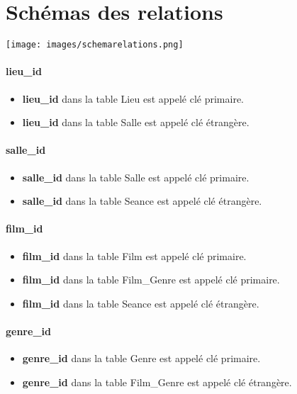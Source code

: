 \documentclass[12pt]{article}
\begin{document}
\section{Schémas des relations}
\texttt{[image: images/schemarelations.png]}
\paragraph*{{\color{cyan}lieu{\_}id}}
\begin{itemize}
    \item \textbf{{\color{cyan}lieu{\_}id}} dans la table Lieu est appelé clé primaire.
    \item \textbf{{\color{cyan}lieu{\_}id}} dans la table Salle est appelé clé étrangère.
\end{itemize}
\paragraph*{{\color{magenta}salle{\_}id}}
\begin{itemize}
    \item \textbf{{\color{magenta}salle{\_}id}} dans la table Salle est appelé clé primaire.
    \item \textbf{{\color{magenta}salle{\_}id}} dans la table Seance est appelé clé étrangère.
\end{itemize}
\pagebreak
\paragraph*{{\color{orange}film{\_}id}}
\begin{itemize}
    \item \textbf{{\color{orange}film{\_}id}} dans la table Film est appelé clé primaire.
    \item \textbf{{\color{orange}film{\_}id}} dans la table Film{\_}Genre est appelé clé primaire.
    \item \textbf{{\color{orange}film{\_}id}} dans la table Seance est appelé clé étrangère.
\end{itemize}
\paragraph*{{\color{violet}genre{\_}id}}
\begin{itemize}
    \item \textbf{{\color{violet}genre{\_}id}} dans la table Genre est appelé clé primaire.
    \item \textbf{{\color{violet}genre{\_}id}} dans la table Film{\_}Genre est appelé clé étrangère.
\end{itemize}
\pagebreak
\end{document}
